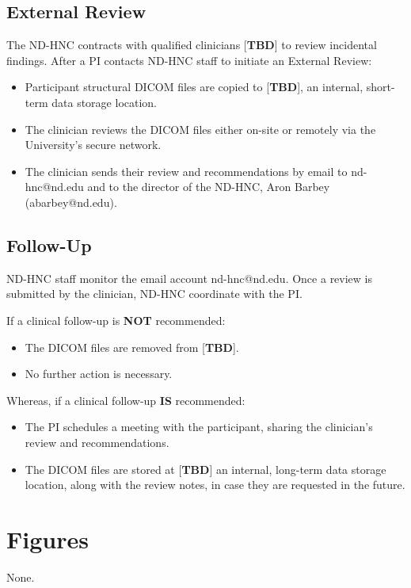 \documentclass[11pt]{article}
\begin{document}
\subsection{External Review}
The ND-HNC contracts with qualified clinicians [\textbf{TBD}] to review incidental findings. After a PI contacts ND-HNC staff to initiate an External Review:

\begin{itemize}
    \item Participant structural DICOM files are copied to [\textbf{TBD}], an internal, short-term data storage location.
    \item The clinician reviews the DICOM files either on-site or remotely via the University's secure network.
    \item The clinician sends their review and recommendations by email to nd-hnc@nd.edu and to the director of the ND-HNC, Aron Barbey (abarbey@nd.edu).
\end{itemize}


\subsection{Follow-Up}
ND-HNC staff monitor the email account nd-hnc@nd.edu. Once a review is submitted by the clinician, ND-HNC coordinate with the PI.

If a clinical follow-up is \textbf{NOT} recommended:

\begin{itemize}
    \item The DICOM files are removed from [\textbf{TBD}].
    \item No further action is necessary.
\end{itemize}


Whereas, if a clinical follow-up \textbf{IS} recommended:

\begin{itemize}
    \item The PI schedules a meeting with the participant, sharing the clinician's review and recommendations.
    \item The DICOM files are stored at [\textbf{TBD}] an internal, long-term data storage location, along with the review notes, in case they are requested in the future.
\end{itemize}

\section{Figures}

None.
\end{document}
